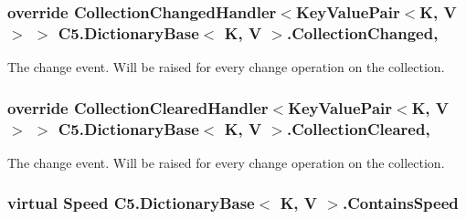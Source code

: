 \hypertarget{class_c5_1_1_dictionary_base_a751f335fff07b5b00a6d9a2d4bb99efa}{}
\subsubsection[{Collection\+Changed}]{\setlength{\rightskip}{0pt plus 5cm}override Collection\+Changed\+Handler$<${\bf Key\+Value\+Pair}$<$K, V$>$ $>$ {\bf C5.\+Dictionary\+Base}$<$ K, V $>$.Collection\+Changed\hspace{0.3cm}{\ttfamily [add]}, {\ttfamily [remove]}}\label{class_c5_1_1_dictionary_base_a751f335fff07b5b00a6d9a2d4bb99efa}


The change event. Will be raised for every change operation on the collection. 

\hypertarget{class_c5_1_1_dictionary_base_ac350f18d63173c7fea97844a5f62f461}{}
\subsubsection[{Collection\+Cleared}]{\setlength{\rightskip}{0pt plus 5cm}override Collection\+Cleared\+Handler$<${\bf Key\+Value\+Pair}$<$K, V$>$ $>$ {\bf C5.\+Dictionary\+Base}$<$ K, V $>$.Collection\+Cleared\hspace{0.3cm}{\ttfamily [add]}, {\ttfamily [remove]}}\label{class_c5_1_1_dictionary_base_ac350f18d63173c7fea97844a5f62f461}


The change event. Will be raised for every change operation on the collection. 

\hypertarget{class_c5_1_1_dictionary_base_ae3c0eb5e4b8a6735f4012b9a370cc769}{}
\subsubsection[{Contains\+Speed}]{\setlength{\rightskip}{0pt plus 5cm}virtual {\bf Speed} {\bf C5.\+Dictionary\+Base}$<$ K, V $>$.Contains\+Speed\hspace{0.3cm}{\ttfamily [get]}}\label{class_c5_1_1_dictionary_base_ae3c0eb5e4b8a6735f4012b9a370cc769}





